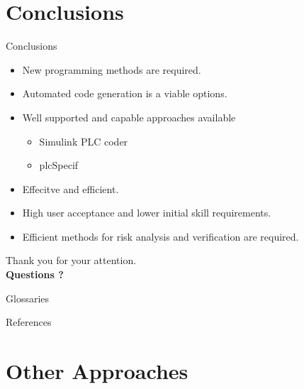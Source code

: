 \documentclass[18pt]{beamer}
\begin{document}
\section{Conclusions}
\begin{frame}{Conclusions}

\begin{itemize}
    \item New programming methods are required.
    \pause
    \item Automated code generation is a viable options.
    \pause
    \item Well supported and capable approaches available 
    \begin{itemize}
        \item Simulink PLC coder
        \item plcSpecif
    \end{itemize}
    \pause
    \item Effecitve and efficient.
    \pause
    \item High user acceptance and lower initial skill requirements.
    \pause
    \item Efficient methods for risk analysis and verification are required.
\end{itemize}
\end{frame}

\begin{frame}
\vfill
\centering
{\LARGE Thank you for your attention.}\\
\vspace{1cm}
{\Large \textbf{Questions ?}}
\vfill
\end{frame}

\appendix
\beginbackup

\begin{frame}[allowframebreaks]{Glossaries}
\printglossaries
\end{frame}

\begin{frame}[allowframebreaks]{References}
\printbibliography
\end{frame}

\section{Other Approaches}
\end{document}
